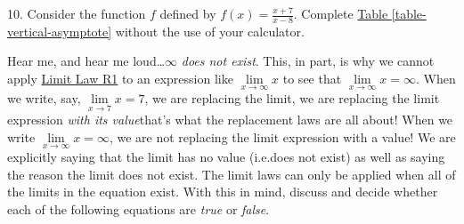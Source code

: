 \documentclass[10pt,oneside,]{book}
\theoremstyle{plain}
\theoremstyle{definition}
\numberwithin{equation}{section}
\newcommand{\hrulemedium}{\noalign{\hrule height 0.07em}}
\newcommand{\hrulethick} {\noalign{\hrule height 0.11em}}
\newcounter{figstack}
\newcounter{figindex}
\newlength\fight
\newcommand\pushValignCaptionBottom[5][b]{%
\stepcounter{figstack}%
\expandafter\def\csname %
figalign\romannumeral\value{figstack}\endcsname{#1}%
\expandafter\def\csname %
figtype\romannumeral\value{figstack}\endcsname{#2}%
\expandafter\def\csname %
figwd\romannumeral\value{figstack}\endcsname{#3}%
\expandafter\def\csname %
figcontent\romannumeral\value{figstack}\endcsname{#4}%
\expandafter\def\csname %
figcap\romannumeral\value{figstack}\endcsname{#5}%
\setbox0=\hbox{%
\begin{#2}{#3}#4\end{#2}}%
\ifdim\dimexpr\ht0+\dp0\relax>\fight\global\setlength{\fight}{%
\dimexpr\ht0+\dp0\relax}\fi%
}
\newcommand\popValignCaptionBottom{%
\setcounter{figindex}{0}%
\hfill%
\whiledo{\value{figindex}<\value{figstack}}{%
\stepcounter{figindex}%
\def\tmp{\csname figwd\romannumeral\value{figindex}\endcsname}%
\begin{\csname figtype\romannumeral\value{figindex}\endcsname}[t]{\tmp}%
\centering%
\stackinset{c}{}%
{\csname figalign\romannumeral\value{figindex}\endcsname}{}%
{\csname figcontent\romannumeral\value{figindex}\endcsname}%
{\rule{0pt}{\fight}}\par%
\csname figcap\romannumeral\value{figindex}\endcsname%
\end{\csname figtype\romannumeral\value{figindex}\endcsname}%
\hfill%
}%
\setcounter{figstack}{0}%
\setlength{\fight}{0pt}%
\hfill%
}
\newcommand{\fe}[2]{#1\mathopen{}\left(#2\right)\mathclose{}}
\begin{document}
\begin{exerciselist}
\item[10.]\hypertarget{exercise-99}{\null}Consider the function \(f\) defined by \(\fe{f}{x}=\frac{x+7}{x-8}\). Complete \hyperref[table-vertical-asymptote]{Table \ref{table-vertical-asymptote}} without the use of your calculator.%
\par\smallskip
\hypertarget{exercisegroup-hear-me}{\null}Hear me, and hear me loud\dots{}\(\infty\) \emph{does not exist}. This, in part, is why we cannot apply \hyperref[llr1]{Limit Law R1} to an expression like \(\lim\limits_{x\to\infty}x\) to see that \(\lim\limits_{x\to\infty}x=\infty\). When we write, say, \(\lim\limits_{x\to7}x=7\), we are replacing the limit, we are replacing the limit expression \emph{with its value}\textemdash{}that's what the replacement laws are all about! When we write \(\lim\limits_{x\to\infty}x=\infty\), we are not replacing the limit expression with a value! We are explicitly saying that the limit has no value (i.e.\@ does not exist) as well as saying the reason the limit does not exist. The limit laws can only be applied when all of the limits in the equation exist. With this in mind, discuss and decide whether each of the following equations are \emph{true} or \emph{false}.%

\end{exerciselist}
\end{document}
